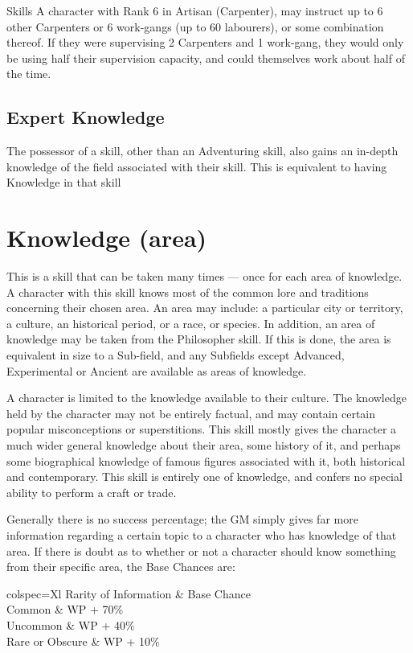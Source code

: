 \begin{Chapter}{Skills}
A character with Rank 6 in Artisan (Carpenter), may instruct up to 6
other Carpenters or 6 work-gangs (up to 60 labourers), or some
combination thereof.  If they were supervising 2 Carpenters and 1
work-gang, they would only be using half their supervision capacity,
and could themselves work about half of the time.

\subsection{Expert Knowledge}

The possessor of a skill, other than an Adventuring skill, also gains
an in-depth knowledge of the field associated with their skill.  This
is equivalent to having Knowledge in that skill

\section{Knowledge (area)}
\label{knowledge}
This is a skill that can be taken many times — once for each area of
knowledge.  A character with this skill knows most of the common lore
and traditions concerning their chosen area. An area may include: a
particular city or territory, a culture, an historical period, or a
race, or species. In addition, an area of knowledge may be taken from
the Philosopher skill. If this is done, the area is equivalent in size
to a Sub-field, and any Subfields except Advanced, Experimental or
Ancient are available as areas of knowledge.

A character is limited to the knowledge available to their
culture. The knowledge held by the character may not be entirely
factual, and may contain certain popular misconceptions or
superstitions.  This skill mostly gives the character a much wider
general knowledge about their area, some history of it, and perhaps
some biographical knowledge of famous figures associated with it, both
historical and contemporary.  This skill is entirely one of knowledge,
and confers no special ability to perform a craft or trade.

Generally there is no success percentage; the GM simply gives far more
information regarding a certain topic to a character who has knowledge
of that area.  If there is doubt as to whether or not a character
should know something from their specific area, the Base Chances are:

\begin{dqtblr}{colspec={Xl}}
Rarity of Information	& Base Chance  \\
Common 			& WP + 70\%  \\
Uncommon 		& WP + 40\%  \\
Rare or Obscure		& WP + 10\% \\
\end{dqtblr}


\end{Chapter}
